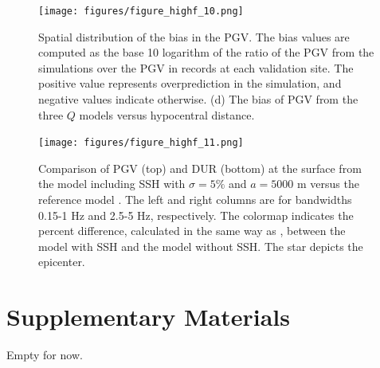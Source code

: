 \begin{figure}[!ht]
  \centering
  \texttt{[image: figures/figure\_highf\_10.png]}
  \caption{Spatial distribution of the bias in the PGV. The bias values are computed as the base 10 logarithm of the ratio of the PGV from the simulations over the PGV in records at each validation site. The positive value represents overprediction in the simulation, and negative values indicate otherwise. (d) The bias of PGV from the three $Q$ models versus hypocentral distance.
  }
  \label{fig:highf-10}
\end{figure}
\clearpage


\begin{figure}[!ht]
  \centering
  \texttt{[image: figures/figure\_highf\_11.png]}
  \caption{Comparison of PGV (top) and DUR (bottom) at the surface from the model including SSH with $\sigma = 5\%$ and $a = 5000$ m versus the reference model . The left and right columns are for bandwidths 0.15-1 Hz and 2.5-5 Hz, respectively. The colormap indicates the percent difference, calculated in the same way as , between the model with SSH and the model without SSH. The star depicts the epicenter.
  }
  \label{fig:highf-11}
\end{figure}
\clearpage




\setcounter{table}{0}
\setcounter{figure}{0}
\renewcommand{\thetable}{S\arabic{chapter}.\arabic{table}}
\renewcommand{\thefigure}{S\arabic{chapter}.\arabic{figure}}
\newpage
\section*{Supplementary Materials}

Empty for now.




\renewcommand{\thetable}{\arabic{table}}
\renewcommand{\thefigure}{\arabic{figure}}


